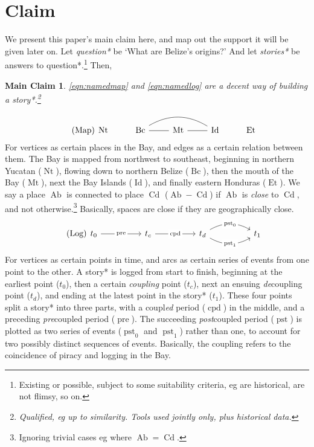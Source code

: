 \documentclass{amsart}
\newcommand{\ment}{\textit} %
\DeclareMathOperator{\ab}{Ab} %
\DeclareMathOperator{\cd}{Cd} %
\DeclareMathOperator{\id}{Id} %
\DeclareMathOperator{\mt}{Mt} %
\DeclareMathOperator{\bc}{Bc} %
\DeclareMathOperator{\et}{Et} %
\DeclareMathOperator{\nt}{Nt} %
\DeclareMathOperator{\pre}{pre} %
\DeclareMathOperator{\pst}{pst} %
\DeclareMathOperator{\cpd}{cpd} %
\newtheorem{mainclm}{Main Claim} %
\theoremstyle{definition}
\theoremstyle{remark}
\begin{document}
\section{Claim}
\label{s:claim}
	We present this paper's main claim here, and map out the support it will be given later on. Let \ment{question*} be `What are Belize's origins?' And let \ment{stories*} be answers to question*.\footnote{Existing or possible, subject to some suitability criteria, eg are historical, are not flimsy, so on.} Then,
	\begin{mainclm}
	\label{clm:maindecency}
	\ref{eqn:namedmap} and \ref{eqn:namedlog} are a decent way of building a story*.\footnote{Qualified, eg up to similarity. Tools used jointly only, plus historical data.}
	\end{mainclm}
	\begin{equation}
	\tag{Map}
	\label{eqn:namedmap}
		\begin{tikzcd}[arrows=dash]
		\nt &\bc \rar \ar[rr,bend left] &\mt \rar &\id &\et
		\end{tikzcd}
	\end{equation}
	For vertices as certain places in the Bay, and edges as a certain relation between them. The Bay is mapped from northwest to southeast, beginning in northern Yucatan (\(\nt\)), flowing down to northern Belize (\(\bc\)), then the mouth of the Bay (\(\mt\)), next the Bay Islands (\(\id\)), and finally eastern Honduras (\(\et\)). We say a place \(\ab\) is connected to place \(\cd\) (\(\ab-\cd\)) if \(\ab\) is \ment{close} to \(\cd\), and not otherwise.\footnote{Ignoring trivial cases eg where \(\ab=\cd\).} Basically, spaces are close if they are geographically close.
	\begin{equation}
	\tag{Log}
	\label{eqn:namedlog}
		\begin{tikzcd}[sep=huge]
		t_0 \rar["\pre" description] &t_c \rar["\cpd" description] &t_d \rar[bend left,"\pst_0" description] \rar[bend right,"\pst_1" description] &t_1
		\end{tikzcd}
	\end{equation}
	For vertices as certain points in time, and arcs as certain series of events from one point to the other. A story* is logged from start to finish, beginning at the earliest point (\(t_0\)), then a certain \ment{coupling} point (\(t_c\)), next an ensuing \ment{de}coupling point (\(t_d\)), and ending at the latest point in the story* (\(t_1\)). These four points split a story* into three parts, with a coupl\ment{ed} period (\(\cpd\)) in the middle, and a preceding \ment{pre}coupled period (\(\pre\)). The succeeding \ment{post}coupled period (\(\pst\)) is plotted as two series of events (\(\pst_0\) and \(\pst_1\)) rather than one, to account for two possibly distinct sequences of events. Basically, the coupling refers to the coincidence of piracy and logging in the Bay.
	
\end{document}
